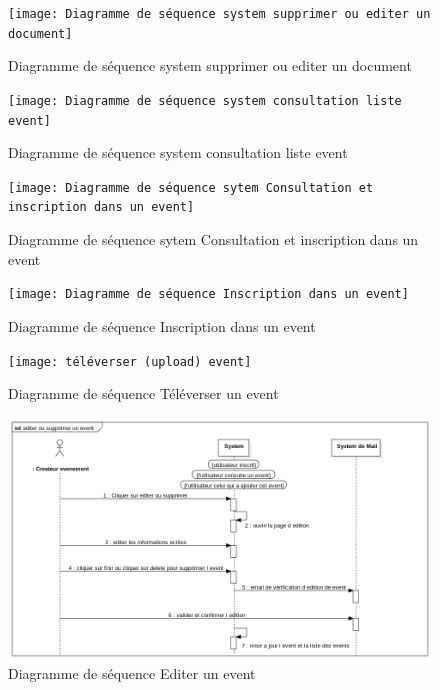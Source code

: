 \documentclass[12pt]{report}
\begin{document}
\newpage

\begin{figure}[h]
    \centering
    \texttt{[image: Diagramme de séquence system supprimer ou editer un document]}
    \caption{Diagramme de séquence system supprimer ou editer un document}
    \label{fig:mesh6}
\end{figure}

\newpage

\begin{figure}[h]
    \centering
    \texttt{[image: Diagramme de séquence system consultation liste event]}
    \caption{Diagramme de séquence system consultation liste event}
    \label{fig:mesh6}
\end{figure}

\newpage

\begin{figure}[h]
    \centering
    \texttt{[image: Diagramme de séquence sytem Consultation et inscription dans un event]}
    \caption{Diagramme de séquence sytem Consultation et inscription dans un event}
    \label{fig:mesh6}
\end{figure}

\newpage

\begin{figure}[h]
    \centering
    \texttt{[image: Diagramme de séquence Inscription dans un event]}
    \caption{Diagramme de séquence Inscription dans un event}
    \label{fig:mesh6}
\end{figure}

\newpage

\begin{figure}[h]
    \centering
    \texttt{[image: téléverser (upload) event]}
    \caption{Diagramme de séquence Téléverser un event}
    \label{fig:mesh6}
\end{figure}

\newpage

\begin{figure}[h]
    \centering
    \includegraphics[width=1\textwidth]{eventEdit}
    \caption{Diagramme de séquence Editer un event}
    \label{fig:mesh6}
\end{figure}
\end{document}
